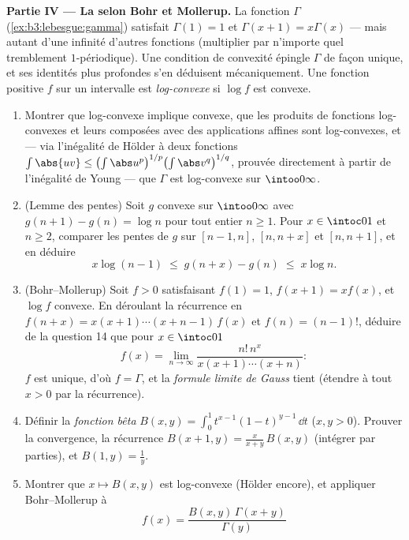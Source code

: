 \begin{problem}
\medskip
\noindent\textbf{Partie IV --- La  selon Bohr
et Mollerup.} La fonction $\Gamma$
(\cref{ex:b3:lebesgue:gamma}) satisfait $\Gamma(1) = 1$ et
$\Gamma(x+1) = x\Gamma(x)$ --- mais autant d'une infinité
d'autres fonctions (multiplier par n'importe quel
tremblement $1$-périodique). Une condition de convexité
épingle $\Gamma$ de façon unique, et ses identités plus
profondes s'en déduisent mécaniquement. Une fonction
positive $f$ sur un intervalle est
\emph{log-convexe} si $\log f$ est
convexe.
\begin{enumerate}[resume]
  \item Montrer que log-convexe implique convexe, que les
        produits de fonctions log-convexes et leurs
        composées avec des applications affines sont
        log-convexes, et --- via l'inégalité de Hölder à
        deux fonctions $\int\abs{uv} \leq
        \bigl(\int\abs u^p\bigr)^{1/p}\bigl(\int\abs
        v^q\bigr)^{1/q}$, prouvée directement à partir de
        l'inégalité de Young --- que $\Gamma$ est
        log-convexe sur $\intoo0\infty$.
  \item (Lemme des pentes) Soit $g$ convexe sur
        $\intoo0\infty$ avec $g(n+1) - g(n) = \log n$ pour
        tout entier $n \geq 1$. Pour $x \in \intoc01$ et
        $n \geq 2$, comparer les pentes de $g$ sur $[n-1,
        n]$, $[n, n+x]$ et $[n, n+1]$, et en déduire
        \[
        x\log(n-1) \;\leq\; g(n + x) - g(n) \;\leq\; x\log
        n .
        \]
  \item (Bohr--Mollerup) Soit $f > 0$ satisfaisant $f(1) =
        1$, $f(x+1) = xf(x)$, et $\log f$ convexe. En
        déroulant la récurrence en $f(n + x) =
        x(x+1)\cdots(x + n - 1)\,f(x)$ et $f(n) =
        (n-1)!$, déduire de la question 14 que pour $x \in
        \intoc01$
        \[
        f(x) = \lim_{n\to\infty}
        \frac{n!\,n^x}{x(x+1)\cdots(x+n)} :
        \]
        $f$ est unique, d'où $f = \Gamma$, et la
        \emph{formule limite de Gauss} tient (étendre à
        tout $x > 0$ par la récurrence).
  \item Définir la \emph{fonction bêta} $B(x, y) =
        \int_0^1t^{x-1}(1-t)^{y-1}\,\dd t$ ($x, y > 0$).
        Prouver la convergence, la récurrence $B(x+1, y) =
        \frac{x}{x+y}\,B(x, y)$ (intégrer par parties), et
        $B(1, y) = \frac1y$.
  \item Montrer que $x \mapsto B(x, y)$ est log-convexe
        (Hölder encore), et appliquer Bohr--Mollerup à
        \[
        f(x) = \frac{B(x, y)\,\Gamma(x + y)}{\Gamma(y)}
\]
\end{enumerate}
\end{problem}
